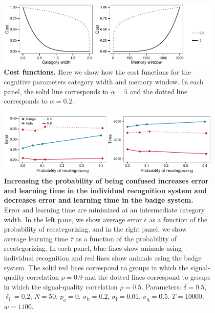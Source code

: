 \begin{figure}[ht]
\includegraphics[width=.8\textwidth]{figures/cost_functions.pdf}
\caption{\sffamily\small\textbf{Cost functions.} Here we show how the cost functions for the cognitive parameters category width and memory window. In each panel, the solid line corresponds to $\alpha=5$ and the dotted line corresponds to $\alpha=0.2$. }
\label{cost_fx}
\end{figure}

\begin{figure}[ht]
\includegraphics[width=6.85in]{figures/confusion_probs.pdf}
\caption{\sffamily\small\textbf{Increasing the probability of being confused increases error and learning time in the individual recognition system and decreases error and learning time in the badge system.} Error and learning time are minimized at an intermediate category width. In the left pane, we show average error $\bar{\epsilon}$ as a function of the probability of recategorizing, and in the right panel, we show average learning time $\bar{\tau}$ as a function of the probability of recategorizing. In each panel, blue lines show animals using individual recognition and red lines show animals using the badge system. The solid red lines correspond to groups in which the signal-quality correlation $\rho=0.9$ and the dotted lines correspond to groups in which the signal-quality correlation $\rho=0.5$. Parameters: $\delta = 0.5$, $\ell_\text{i}=0.2$, $N=50$, $p_\text{o}=0$, $\sigma_\text{b}=0.2$, $\sigma_\text{i}=0.01$, $\sigma_\text{q}=0.5$, $T=10000$, $w=1100$.}
\label{confusion_probs}
\end{figure}

